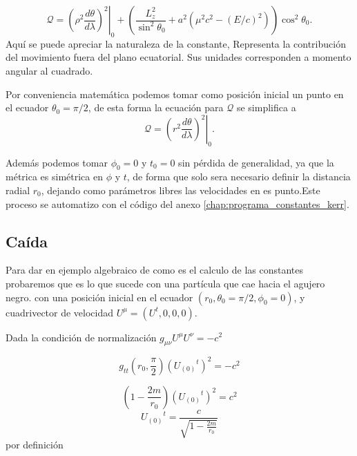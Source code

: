 \begin{equation}
    \mathcal{Q}=\left.\left(\rho^2 \frac{d \theta}{d \lambda}\right)^2\right|_0 +\left(\frac{L_z^2}{\sin ^2 \theta_0}+a^2\left(\mu^2 c^2-(E/c)^2\right)\right) \cos ^2 \theta_0 .
\end{equation}
Aquí se puede apreciar la naturaleza de la constante, Representa la contribución del movimiento fuera del plano ecuatorial. Sus unidades corresponden a momento angular al cuadrado.

Por conveniencia matemática podemos tomar como posición inicial un punto en el ecuador $\theta_0=\pi / 2$, de esta forma la ecuación para $\mathcal{Q}$ se simplifica a
\begin{equation}
    \mathcal{Q}=\left.\left(r^2 \frac{d \theta}{d \lambda}\right)^2\right|_0  .
\end{equation}

Además podemos tomar $\phi_0=0$ y $t_0=0$ sin pérdida de generalidad, ya que la métrica es simétrica en $\phi$ y $t$, de forma que solo sera necesario definir la distancia radial $r_0$, dejando como parámetros libres las velocidades en es punto.Este proceso se automatizo con el código del anexo \ref{chap:programa_constantes_kerr}.


\subsection{Caída }
Para dar en ejemplo algebraico de como es el calculo de las constantes probaremos que es lo que sucede con una partícula que cae hacia el agujero negro. con una posición inicial en el ecuador $(r_0, \theta_0=\pi/2, \phi_0=0)$, y cuadrivector de velocidad $U^\mu = (U^t, 0, 0, 0 )$.

Dada la condición de normalización $g_{\mu \nu} U^\mu U^\nu=-c^2$

\begin{equation}
    g_{t t}\left(r_0, \frac{\pi}{2}\right)\left({U_{(0)}}^t\right)^2=-c^2
\end{equation}


\begin{equation}
    \left(1-\frac{2 m }{r_0}\right)\left({U_{(0)}}^t\right)^2=c^2
\end{equation}
\begin{equation}
    {U_{(0)}}^t = \frac{c}{\sqrt{1-\frac{2 m }{r_0}}}
\end{equation}
por definición

